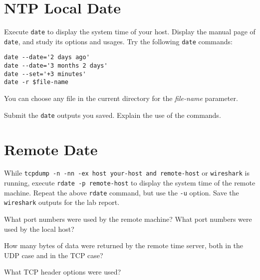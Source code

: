 \documentclass{../UTNetLab}
\begin{document}
\section{NTP Local Date}
    Execute \lstinline{date} to display the system time of your host.
    Display the manual page of \lstinline{date}, and study its options and usages.
    Try the following \lstinline{date} commands: 

    \begin{lstlisting}[emph={$file-name}]
date --date='2 days ago'
date --date='3 months 2 days'
date --set='+3 minutes'
date -r $file-name
    \end{lstlisting}
    You can choose any file in the current directory for the \textit{file-name} parameter.
    
    \begin{report}
    \item Submit the \lstinline{date} outputs you saved.
    Explain the use of the commands.
    \end{report}

\section{Remote Date}
    While \lstinline[emph={your-host, remote-host}]{tcpdump -n -nn -ex host your-host and remote-host} or \lstinline{wireshark} is running, execute \lstinline[emph={your-host, remote-host}]{rdate -p remote-host} to display the system time of the remote machine.
    Repeat the above \lstinline{rdate} command, but use the \lstinline{-u} option.
    Save the \lstinline{wireshark} outputs for the lab report.

    \begin{report}
    \item What port numbers were used by the remote machine?
    What port numbers were used by the local host?
    
    \item How many bytes of data were returned by the remote time server, both in the UDP case and in the TCP case?
    
    \item What TCP header options were used?
    \end{report}
\end{document}
